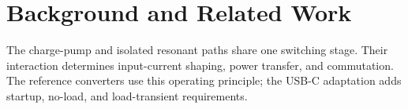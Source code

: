 \chapter{Background and Related Work}
\label{ch:background}

The charge-pump and isolated resonant paths share one switching stage. Their interaction determines input-current shaping, power transfer, and commutation. The reference converters use this operating principle; the USB-C adaptation adds startup, no-load, and load-transient requirements.










